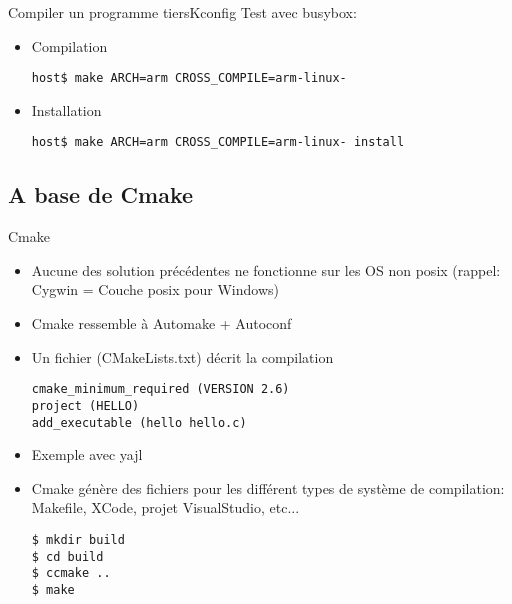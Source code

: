 \begin{frame}[fragile=singleslide]{Compiler un programme tiers}{Kconfig}
  Test avec busybox:
  \begin{itemize}
  \item Compilation
\begin{lstlisting}
host$ make ARCH=arm CROSS_COMPILE=arm-linux-
\end{lstlisting} %
  \item Installation
\begin{lstlisting}
host$ make ARCH=arm CROSS_COMPILE=arm-linux- install
\end{lstlisting} %
  \end{itemize}
\end{frame}

\subsection{A base de Cmake}

\begin{frame}[fragile=singleslide]{Cmake}
  \begin{itemize}
  \item Aucune des  solution précédentes ne fonctionne sur  les OS non
    posix (rappel: Cygwin = Couche posix pour Windows)
  \item Cmake ressemble à Automake + Autoconf
  \item Un fichier (CMakeLists.txt) décrit la compilation
    \begin{lstlisting}
cmake_minimum_required (VERSION 2.6)
project (HELLO)
add_executable (hello hello.c)
    \end{lstlisting}
  \item Exemple avec yajl
  \item Cmake génère des fichiers  pour les différent types de système
    de compilation: Makefile, XCode, projet VisualStudio, etc...
    \begin{lstlisting}
$ mkdir build
$ cd build
$ ccmake ..
$ make
    \end{lstlisting}
\end{itemize}
\end{frame}

